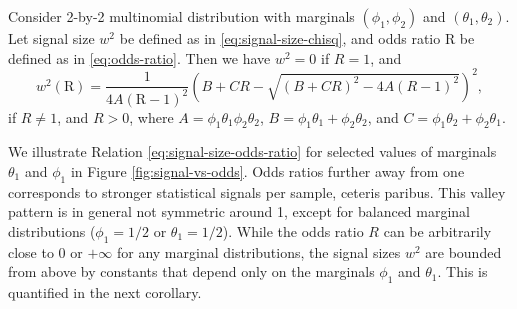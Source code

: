 \begin{proposition} \label{prop:signal-size-odds-ratio}
Consider 2-by-2 multinomial distribution with marginals $(\phi_1, \phi_2)$ and $(\theta_1, \theta_2)$.
Let signal size $w^2$ be defined as in \eqref{eq:signal-size-chisq}, and odds ratio $\text{R}$ be defined as in \eqref{eq:odds-ratio}. 
Then we have $w^2 = 0$ if $R=1$, and
\begin{equation} \label{eq:signal-size-odds-ratio}
    w^2(\text{R}) =
    \frac{1}{4A(\text{R}-1)^2}\left(B+CR-\sqrt{(B+CR)^2-4A(R-1)^2}\right)^2,
\end{equation}
if $R\neq1$, and $R>0$, 
where $A = \phi_1\theta_1\phi_2\theta_2$, $B = \phi_1\theta_1+\phi_2\theta_2$, and $C = \phi_1\theta_2+\phi_2\theta_1$.
\end{proposition}

We illustrate Relation \eqref{eq:signal-size-odds-ratio} for selected values of marginals $\theta_1$ and $\phi_1$ in Figure \ref{fig:signal-vs-odds}.
Odds ratios further away from one corresponds to stronger statistical signals per sample, ceteris paribus.
This valley pattern is in general not symmetric around 1, except for balanced marginal distributions ($\phi_1=1/2$ or $\theta_1=1/2$).
While the odds ratio $R$ can be arbitrarily close to 0 or $+\infty$ for any marginal distributions, the signal sizes $w^2$ are bounded from above by constants that depend only on the marginals $\phi_1$ and $\theta_1$.
This is quantified in the next corollary.

